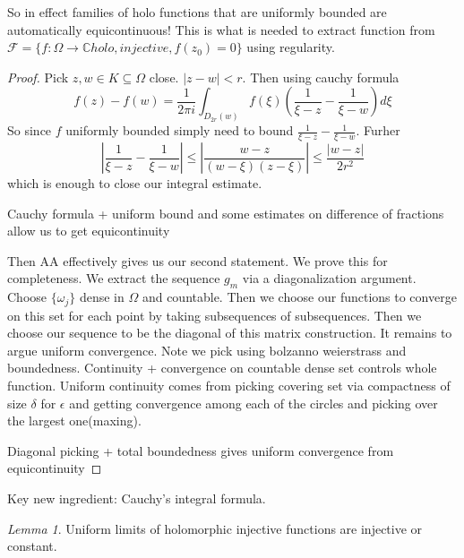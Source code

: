 \documentclass[11pt]{article}
\newcommand{\normOne}[1]{\left\lvert#1\right\rvert}
\theoremstyle{remark}
\newtheorem{lemma}{Lemma}
\begin{document}
So in effect families of holo functions that are uniformly bounded are automatically equicontinuous! This is what is needed to extract function from $\mathcal{F} = \{f : \Omega \to \mathbb{C} holo, injective,f(z_0) = 0\}$ using regularity.

\begin{proof}
	Pick $z,w \in K \subseteq \Omega$ close. $\normOne{z-w} < r$. Then using cauchy formula
	\begin{equation*}
		f(z)-f(w) = \frac{1}{2\pi i}\int_{D_{2r}(w)}f(\xi)(\frac{1}{\xi - z}-\frac{1}{\xi-w})d\xi
	\end{equation*}
	So since $f$ uniformly bounded simply need to bound $\frac{1}{\xi - z}-\frac{1}{\xi-w}$. Furher
	\begin{equation*}
		\normOne{\frac{1}{\xi - z}-\frac{1}{\xi-w}} \leq \normOne{\frac{w-z}{(w-\xi)(z-\xi)}} \leq \frac{\normOne{w-z}}{2r^2}
	\end{equation*}
	which is enough to close our integral estimate.

	Cauchy formula + uniform bound and some estimates on difference of fractions allow us to get equicontinuity 

	Then AA effectively gives us our second statement. We prove this for completeness. We extract the sequence $g_m$ via a diagonalization argument. Choose $\{\omega_j\}$ dense in $\Omega$ and countable. Then we choose our functions to converge on this set for each point by taking subsequences of subsequences. Then we choose our sequence to be the diagonal of this matrix construction. It remains to argue uniform convergence. Note we pick using bolzanno weierstrass and boundedness. Continuity + convergence on countable dense set controls whole function. Uniform continuity comes from picking covering set via compactness of size $\delta$ for $\epsilon$ and getting convergence among each of the circles and picking over the largest one(maxing).

	Diagonal picking + total boundedness gives uniform convergence from equicontinuity
\end{proof}

Key new ingredient: Cauchy's integral formula.

\begin{lemma}
	Uniform limits of holomorphic injective functions are injective or constant.
\end{lemma}
\end{document}
